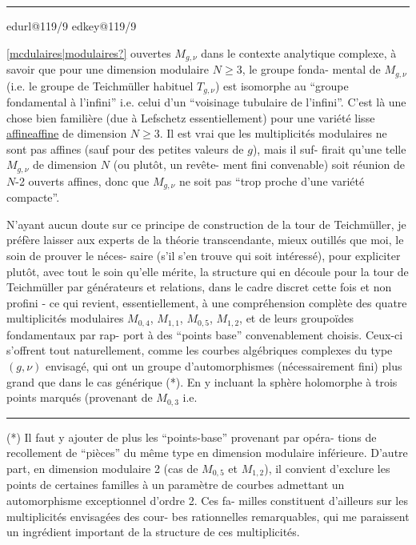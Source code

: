 \documentclass[11pt,a4paper]{article}
\makeatletter
\newif\ifdiplomatic
\newif\ifreading
\newif\ifenglish
\def\CurrentScanURL{}
\def\CurrentPageKey{}
\def\CurrentApparatus{}
\newcounter{appnote}
\newcommand{\scanpage}[1]{%
  \clearpage
  \expandafter\let\expandafter\CurrentScanURL\csname edurl@#1\endcsname
  \expandafter\let\expandafter\CurrentPageKey\csname edkey@#1\endcsname
  \def\CurrentApparatus{}%
  \hypertarget{scan-\CurrentPageKey}{}%
  \typeout{EDITION-SCAN: \CurrentPageKey; PDFPAGE: \the\numexpr\ReadonlyShipoutCounter+1\relax}%
  \ifreading
    \marginnote{\raggedright\scriptsize\sffamily\href{\CurrentScanURL}{119 / \csname edpage@#1\endcsname}}%
  \else
    \noindent{\small\sffamily\href{\CurrentScanURL}{[scan #1]}}\par\smallskip
  \fi}
\newcommand{\mspage}[1]{%
  \ifreading\marginnote{\raggedright\scriptsize\sffamily p.\,#1}[2\baselineskip]%
  \else\noindent{\small\sffamily[p.\,#1]}\par\smallskip\fi}
\let\TextUline\uline
\renewcommand{\uline}[1]{\ifmmode\underline{#1}\else\TextUline{#1}\fi}
\newcommand{\unsure}[1]{\href{\CurrentScanURL}{[#1?]}}
\newcommand{\margin}[1]{%
  \sbox{\MarginalTestBox}{\parbox{\marginparwidth}{\raggedright\footnotesize#1}}%
  \ifdim\dimexpr\ht\MarginalTestBox+\dp\MarginalTestBox\relax>3\baselineskip
    \par\smallskip\noindent\begin{minipage}{\linewidth}\hrule\smallskip
    {\footnotesize\textcolor{HandInk}{\ifenglish Marginal note:\else Note marginale :\fi\ #1}}\smallskip\hrule\end{minipage}\par\smallskip
  \else
    \marginnote{\raggedright\footnotesize\textcolor{HandInk}{#1}}%
  \fi}
\newcommand{\AppItem}[2]{\par\noindent\textsuperscript{#1}\csname edvariant@#2\endcsname}
\newcommand{\EditionApp}[1]{%
  \stepcounter{appnote}%
  \ifmmode{}^{\scriptscriptstyle\theappnote}\else\textsuperscript{\theappnote}\fi
  \begingroup\edef\x{\endgroup\noexpand\gappto\noexpand\CurrentApparatus{\noexpand\AppItem{\theappnote}{#1}}}\x}
\newcommand{\var}[4]{\ifdiplomatic#1\else#2\ifreading\else\EditionApp{#4}\fi\fi}
\newcommand{\finishscan}{\ifx\CurrentApparatus\empty\else\par\bigskip\noindent\rule{.35\linewidth}{.35pt}\par\smallskip{\footnotesize\setlength{\parskip}{3pt}\CurrentApparatus}\fi}
\makeatother
\begin{document}
\margin{8}

\finishscan
\scanpage{119/9}
\mspage{7}

\unsure{mcdulaires|modulaires} ouvertes $M_{g,\nu}$ dans le contexte analytique complexe,
à savoir que pour une dimension modulaire $N \geq 3$, le groupe fonda-%
mental de $M_{g,\nu}$ (i.e. le groupe de Teichmüller habituel $T_{g,\nu}$)
est isomorphe au ``groupe fondamental à l'infini'' i.e. celui d'un
``voisinage tubulaire de l'infini''. C'est là une chose bien familière
(due à Lefschetz essentiellement) pour une variété lisse \uline{affine} de
dimension $N \geq 3$. Il est vrai que les multiplicités modulaires ne
sont pas affines (sauf pour des petites valeurs de $g$), mais il suf-%
firait qu'une telle $M_{g,\nu}$ de dimension $N$ (ou plutôt, un revête-%
ment fini \var{convenanble}{convenable}{slip corrected}{V-FR-009-001}) soit réunion de $N$-2 ouverts affines, donc
que $M_{g,\nu}$ ne soit pas ``trop proche d'une variété compacte''.

N'ayant aucun doute sur ce principe de construction de la
tour de Teichmüller, je préfère laisser aux experts de la théorie
transcendante, mieux outillés que moi, le soin de prouver le néces-%
saire (s'il s'en trouve qui soit intéressé), pour expliciter plutôt,
avec tout le soin qu'elle mérite, la structure qui en découle pour
la tour de Teichmüller par générateurs et relations, dans le cadre
discret cette fois et non profini - ce qui revient, essentiellement,
à une compréhension complète des quatre multiplicités modulaires
$M_{0,4}$, $M_{1,1}$, $M_{0,5}$, $M_{1,2}$, et de leurs groupoïdes fondamentaux par rap-%
port à des ``points base'' convenablement choisis. Ceux-ci s'offrent
tout naturellement, comme les courbes algébriques complexes du type
$(g,\nu)$ envisagé, qui ont un groupe d'automorphismes (nécessairement
fini) plus grand que dans le cas générique (*). En y incluant la
sphère holomorphe à trois points marqués (provenant de $M_{0,3}$ i.e.

\rule{4cm}{0.4pt}

(*) Il faut y ajouter de plus les ``points-base'' provenant par opéra-%
tions de recollement de ``pièces'' du même type en dimension modulaire
inférieure. D'autre part, en dimension modulaire 2 (cas de $M_{0,5}$ et $M_{1,2}$),
il convient d'exclure les points de certaines familles à un paramètre
de courbes admettant un automorphisme exceptionnel d'ordre 2. Ces fa-%
milles constituent d'ailleurs sur les multiplicités envisagées des cour-%
bes rationnelles remarquables, qui me paraissent un ingrédient important
de la structure de ces multiplicités.
\end{document}
